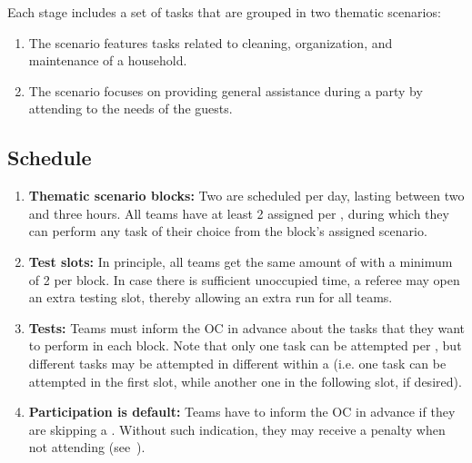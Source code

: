 Each stage includes a set of tasks that are grouped in two thematic scenarios:
\begin{enumerate}
	\item The  scenario features tasks related to cleaning, organization, and maintenance of a household.
	\item The  scenario focuses on providing general assistance during a party by attending to the needs of the guests.
\end{enumerate}

\subsection{Schedule}
\label{rule:schedule}

\begin{enumerate}
	\item \textbf{Thematic scenario blocks:} Two \Testblocks{} are scheduled per day, lasting between two and three hours.
	All teams have at least 2 \Testslots{} assigned per \Testblock{}, during which they can perform any task of their choice from the block's assigned scenario.

	\item \textbf{Test slots:} In principle, all teams get the same amount of \Testslots{} with a minimum of 2 per block.
	In case there is sufficient unoccupied time, a referee may open an extra testing slot, thereby allowing an extra run for all teams.

	\item \textbf{Tests:} Teams must inform the OC in advance about the tasks that they want to perform in each block.
	Note that only one task can be attempted per \Testslot, but different tasks may be attempted in different \Testslots{} within a \Testblock{} (i.e. one task can be attempted in the first slot, while another one in the following slot, if desired).

	\item \textbf{Participation is default:} Teams have to inform the OC in advance if they are skipping a \Testslot. Without such indication, they may receive a penalty when not attending (see~).
\end{enumerate}

